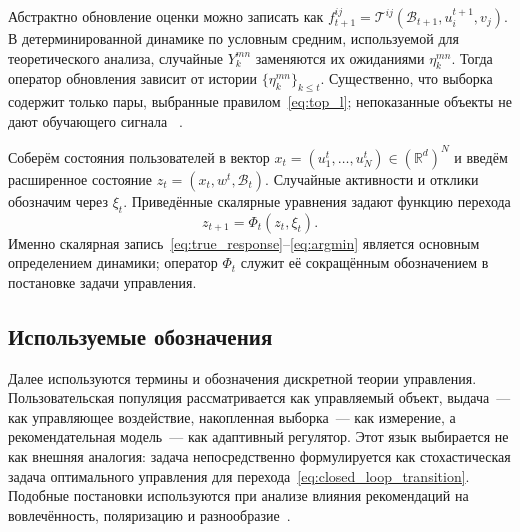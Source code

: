 Абстрактно обновление оценки можно записать как
$f_{t+1}^{ij}=\mathscr T^{ij}(\mathcal B_{t+1},u_i^{t+1},v_j)$. В
детерминированной динамике по условным средним, используемой для теоретического
анализа, случайные $Y_k^{mn}$ заменяются их ожиданиями $\eta_k^{mn}$. Тогда
оператор обновления зависит от истории
$\{\eta_k^{mn}\}_{k\le t}$. Существенно, что выборка содержит только пары, выбранные
правилом~\eqref{eq:top_l}; непоказанные объекты не дают обучающего сигнала
~\cite{bottou2013, sinha2016, krauth2022}.

Соберём состояния пользователей в вектор
$x_t=(u_1^t,\ldots,u_N^t)\in(\mathbb R^d)^N$ и введём расширенное состояние
$z_t=(x_t,w^t,\mathcal B_t)$. Случайные активности и отклики обозначим через
$\xi_t$. Приведённые скалярные уравнения задают функцию перехода
\begin{equation}
    z_{t+1}=\Phi_t(z_t,\xi_t).
    \label{eq:closed_loop_transition}
\end{equation}
Именно скалярная запись~\eqref{eq:true_response}--\eqref{eq:argmin} является
основным определением динамики; оператор $\Phi_t$ служит её сокращённым
обозначением в постановке задачи управления.

\subsection{Используемые обозначения}
\label{subsec:control_notation}

Далее используются термины и обозначения дискретной теории управления.
Пользовательская популяция рассматривается как управляемый объект, выдача~--- как
управляющее воздействие, накопленная выборка~--- как измерение, а
рекомендательная модель~--- как адаптивный регулятор. Этот язык выбирается не
как внешняя аналогия:
задача непосредственно формулируется как стохастическая задача оптимального
управления для перехода~\eqref{eq:closed_loop_transition}. Подобные постановки
используются при анализе влияния рекомендаций на вовлечённость, поляризацию и
разнообразие~\cite{depasquale2026controlSystems,
sprenger2024controlStrategies, mariano2026optimalControl,
chandrasekaran2026networkAware}.

